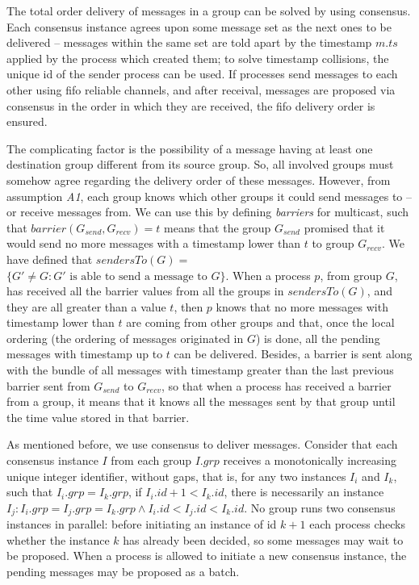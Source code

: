 \documentclass[times, 10pt]{article}
\begin{document}
The total order delivery of messages in a group can be solved by using consensus. Each consensus instance agrees upon some message set as the next ones to be delivered -- messages within the same set are told apart by the timestamp $m.ts$ applied by the process which created them; to solve timestamp collisions, the unique id of the sender process can be used. If processes send messages to each other using fifo reliable channels, and after receival, messages are proposed via consensus in the order in which they are received, the fifo delivery order is ensured.

The complicating factor is the possibility of a message having at least one destination group different from its source group. So, all involved groups must somehow agree regarding the delivery order of these messages. However, from assumption \emph{A1}, each group knows which other groups it could send messages to -- or receive messages from. We can use this by defining \emph{barriers} for multicast, such that \mbox{$barrier(G_{send},G_{recv}) = t$} means that the group $G_{send}$ promised that it would send no more messages with a timestamp lower than $t$ to group $G_{recv}$. We have defined that $sendersTo(G) =$ \mbox{$\{G' \neq G : G'\text{ is able to send a message to }G\}$}. When a process $p$, from group $G$, has received all the barrier values from all the groups in $sendersTo(G)$, and they are all greater than a value $t$, then $p$ knows that no more messages with timestamp lower than $t$ are coming from other groups and that, once the local ordering (the ordering of messages originated in $G$) is done, all the pending messages with timestamp up to $t$ can be delivered. Besides, a barrier is sent along with the bundle of all messages with timestamp greater than the last previous barrier sent from $G_{send}$ to $G_{recv}$, so that when a process has received a barrier from a group, it means that it knows all the messages sent by that group until the time value stored in that barrier.

As mentioned before, we use consensus to deliver messages. Consider that each consensus instance $I$ from each group $I.grp$ receives a monotonically increasing unique integer identifier, without gaps, that is, for any two instances $I_i$ and $I_k$, such that $I_i.grp = I_k.grp$, if $I_i.id + 1 < I_k.id$, there is necessarily an instance $I_j : I_i.grp = I_j.grp = I_k.grp \wedge I_i.id < I_j.id < I_k.id$. No group runs two consensus instances in parallel: before initiating an instance of id $k+1$ each process checks whether the instance $k$ has already been decided, so some messages may wait to be proposed. When a process is allowed to initiate a new consensus instance, the pending messages may be proposed as a batch.%
\end{document}
